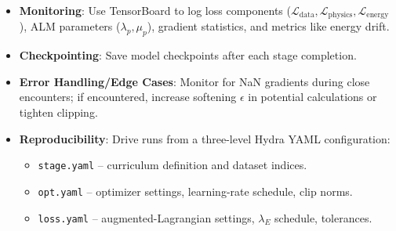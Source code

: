 \documentclass{article}
\begin{document}
\begin{itemize}
    \item \textbf{Monitoring}: Use TensorBoard to log loss components ($\mathcal{L}_{\text{data}}, \mathcal{L}_{\text{physics}}, \mathcal{L}_{\text{energy}}$), ALM parameters ($\lambda_p, \mu_p$), gradient statistics, and metrics like energy drift.
    \item \textbf{Checkpointing}: Save model checkpoints after each stage completion.
    \item \textbf{Error Handling/Edge Cases}: Monitor for NaN gradients during close encounters; if encountered, increase softening $\epsilon$ in potential calculations or tighten clipping.
    \item \textbf{Reproducibility}: Drive runs from a three-level Hydra YAML configuration:
    \begin{itemize}
        \item \texttt{stage.yaml} -- curriculum definition and dataset indices.
        \item \texttt{opt.yaml} -- optimizer settings, learning-rate schedule, clip norms.
        \item \texttt{loss.yaml} -- augmented-Lagrangian settings, $\lambda_E$ schedule, tolerances.
    \end{itemize}
\end{itemize}
\end{document}
